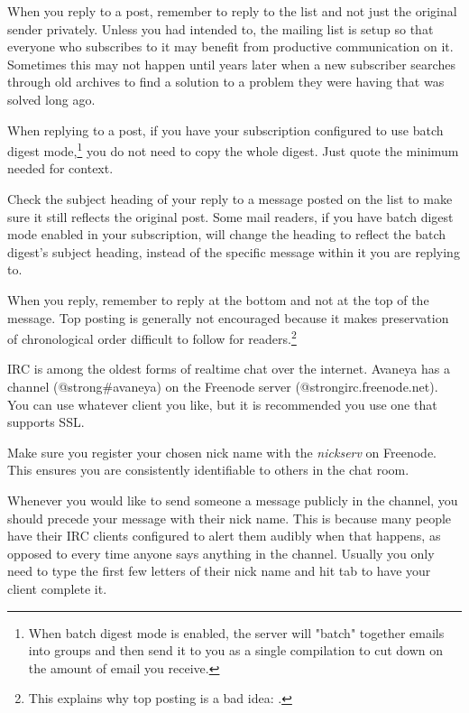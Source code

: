 \item
When you reply to a post, remember to reply to the list and not just the original sender privately. Unless you had intended to, the mailing list is setup so that everyone who subscribes to it may benefit from productive communication on it. Sometimes this may not happen until years later when a new subscriber searches through old archives to find a solution to a problem they were having that was solved long ago.

\item
When replying to a post, if you have your subscription configured to use batch digest mode,\footnote{When batch digest mode is enabled, the server will "batch" together emails into groups and then send it to you as a single compilation to cut down on the amount of email you receive.} you do not need to copy the whole digest. Just quote the minimum needed for context.

\item
Check the subject heading of your reply to a message posted on the list to make sure it still reflects the original post. Some mail readers, if you have batch digest mode enabled in your subscription, will change the heading to reflect the batch digest's subject heading, instead of the specific message within it you are replying to.

\item
When you reply, remember to reply at the bottom and not at the top of the message. Top posting is generally not encouraged because it makes preservation of chronological order difficult to follow for readers.\footnote{This explains why top posting is a bad idea: .}
\stopitemize


IRC is among the oldest forms of realtime chat over the internet. Avaneya has a channel (@strong{#avaneya}) on the Freenode server (@strong{irc.freenode.net}). You can use whatever client you like, but it is recommended you use one that supports SSL.

Make sure you register your chosen nick name with the {\it nickserv} on Freenode. This ensures you are consistently identifiable to others in the chat room.

Whenever you would like to send someone a message publicly in the channel, you should precede your message with their nick name. This is because many people have their IRC clients configured to alert them audibly when that happens, as opposed to every time anyone says anything in the channel. Usually you only need to type the first few letters of their nick name and hit tab to have your client complete it.


